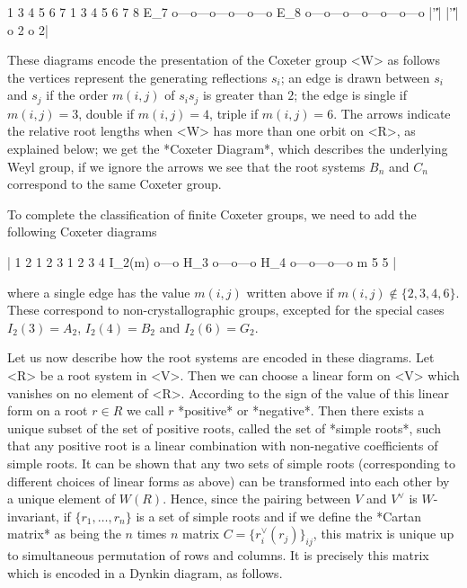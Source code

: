          1   3   4   5   6   7            1   3   4   5   6   7   8
   E_7   o---o---o---o---o---o       E_8  o---o---o---o---o---o---o
                 |'\|'|                                |'\|'|
                 o 2                              o 2|
\par\bigskip
These  diagrams  encode  the  presentation  of  the  Coxeter  group  <W> as
follows\:  the vertices represent the generating reflections $s_i$; an edge
is  drawn between  $s_i$ and  $s_j$ if  the order  $m(i,j)$ of  $s_is_j$ is
greater  than $2$; the edge is  single if $m(i,j)=3$, double if $m(i,j)=4$,
triple  if $m(i,j)=6$. The  arrows indicate the  relative root lengths when
<W> has more than one orbit on <R>, as explained below; we get the *Coxeter
Diagram*,  which  describes  the  underlying  Weyl  group, if we ignore the
arrows\:  we see that  the root systems  $B_n$ and $C_n$  correspond to the
same Coxeter group.

To complete the classification of finite Coxeter groups, we need to add the
following Coxeter diagrams\:

|             1   2                 1   2   3          1   2   3   4
   I_2(m)    o---o            H_3  o---o---o     H_4  o---o---o---o
               m                     5                  5           |

where  a single edge has the value $m(i,j)$ written above if $m(i,j)\not\in
\{2,3,4,6\}$. These correspond to non-crystallographic groups, excepted for
the special cases $I_2(3)=A_2$, $I_2(4)=B_2$ and $I_2(6)=G_2$.

Let us now describe how the root systems are encoded in these diagrams. Let
<R>  be a root system in <V>. Then we can choose a linear form on <V> which
vanishes  on no element of <R>. According to  the sign of the value of this
linear  form on a root $r \in R$ we call $r$ *positive* or *negative*. Then
there  exists a unique subset of the  set of positive roots, called the set
of *simple roots*, such that any positive root is a linear combination with
non-negative  coefficients of  simple roots.  It can  be shown that any two
sets of simple roots (corresponding to different choices of linear forms as
above)  can be transformed into  each other by a  unique element of $W(R)$.
Hence,  since the  pairing between  $V$ and  $V^\vee$ is  $W$-invariant, if
$\{r_1,\ldots,r_n\}$  is a set of simple roots and if we define the *Cartan
matrix*  as being the $n$ times $n$ matrix $C=\{r_i^\vee(r_j)\}_{ij}$, this
matrix  is unique up to simultaneous permutation of rows and columns. It is
precisely this matrix which is encoded in a Dynkin diagram, as follows.

